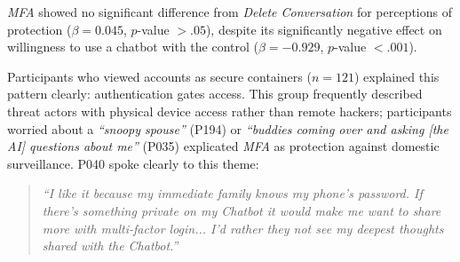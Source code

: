 \documentclass[letterpaper,twocolumn,10pt]{article}
\begin{document}
\begin{table}[htbp]
\centering
\def\arraystretch{1.2}
\caption{CLMM Results: Perceived protection when interacting with GenAI chatbots for emotional support}
\label{tab:protection}
\end{table}

\emph{MFA} showed no significant difference from \emph{Delete Conversation} for perceptions of protection ($\beta = 0.045$, $p$-value $> .05$), despite its significantly negative effect on willingness to use a chatbot with the control ($\beta = -0.929$, $p$-value $< .001$). 

Participants who viewed accounts as secure containers ($n=121$) explained this pattern clearly: authentication gates access. This group frequently described threat actors with physical device access rather than remote hackers; participants worried about a \textit{``snoopy spouse''} (P194) or \textit{``buddies coming over and asking [the AI] questions about me''} (P035) explicated \emph{MFA} as protection against domestic surveillance. P040 spoke clearly to this theme:

\begin{quote}
\textit{``I like it because my immediate family knows my phone's password. If there's something private on my Chatbot it would make me want to share more with multi-factor login... I'd rather they not see my deepest thoughts shared with the Chatbot.''}
\end{quote}
\end{document}
